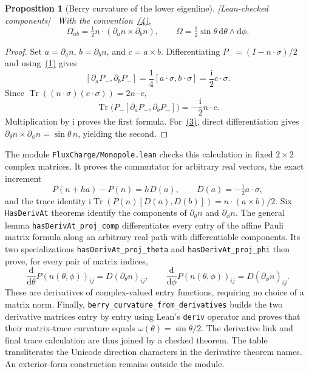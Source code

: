 \documentclass[11pt]{article}
\newtheorem{proposition}[theorem]{Proposition}
\theoremstyle{definition}\newtheorem{definition}[theorem]{Definition}
\theoremstyle{remark}\newtheorem{remark}[theorem]{Remark}
\newcommand{\Tr}{\operatorname{Tr}}
\newcommand{\ii}{\mathrm{i}}
\newcommand{\dd}{\mathrm{d}}
\newcommand{\checked}{\textnormal{\small[Lean-checked components]}\ }
\begin{document}
\begin{proposition}[Berry curvature of the lower eigenline]\label{prop:curvature}\checked
With the convention~\hyperref[eq:berryconv]{(4)},
\hypertarget{eq:omega}{}
\begin{equation}
 \Omega_{ab}=\tfrac12 n\cdot(\partial_a n\times\partial_b n),
 \qquad \Omega=\tfrac12\sin\theta\,\dd\theta\wedge\dd\phi.
\end{equation}
\end{proposition}
\begin{proof}
Set $a=\partial_a n$, $b=\partial_b n$, and $c=a\times b$. Differentiating $P_-=(I-n\cdot\sigma)/2$ and using~\hyperref[eq:pauli]{(1)} gives
\[
 [\partial_aP_-,\partial_bP_-]=\frac14[a\cdot\sigma,b\cdot\sigma]
 =\frac{\ii}{2}c\cdot\sigma.
\]
Since $\Tr((n\cdot\sigma)(c\cdot\sigma))=2n\cdot c$,
\[
 \Tr\bigl(P_-[\partial_aP_-,\partial_bP_-]\bigr)
 =-\frac{\ii}{2}n\cdot c.
\]
Multiplication by $\ii$ proves the first formula. For~\hyperref[eq:n]{(3)}, direct differentiation gives $\partial_\theta n\times\partial_\phi n=\sin\theta\,n$, yielding the second.
\end{proof}
The module \texttt{FluxCharge/Monopole.lean} checks this calculation in fixed $2\times2$ complex matrices. It proves the commutator for arbitrary real vectors, the exact increment
\[
 P(n+ha)-P(n)=hD(a),\qquad D(a)=-\tfrac12a\cdot\sigma,
\]
and the trace identity $\ii\Tr(P(n)[D(a),D(b)])=n\cdot(a\times b)/2$. Six \texttt{HasDerivAt} theorems identify the components of $\partial_\theta n$ and $\partial_\phi n$. The general lemma \texttt{hasDerivAt\_proj\_comp} differentiates every entry of the affine Pauli matrix formula along an arbitrary real path with differentiable components. Its two specializations \texttt{hasDerivAt\_proj\_theta} and \texttt{hasDerivAt\_proj\_phi} then prove, for every pair of matrix indices,
\[
 \frac{\dd}{\dd\theta}P(n(\theta,\phi))_{ij}=D(\partial_\theta n)_{ij},
 \qquad
 \frac{\dd}{\dd\phi}P(n(\theta,\phi))_{ij}=D(\partial_\phi n)_{ij}.
\]
These are derivatives of complex-valued entry functions, requiring no choice of a matrix norm. Finally, \texttt{berry\_curvature\_from\_derivatives} builds the two derivative matrices entry by entry using Lean's \texttt{deriv} operator and proves that their matrix-trace curvature equals $\omega(\theta)=\sin\theta/2$. The derivative link and final trace calculation are thus joined by a checked theorem. The table transliterates the Unicode direction characters in the derivative theorem names. An exterior-form construction remains outside the module.
\end{document}
